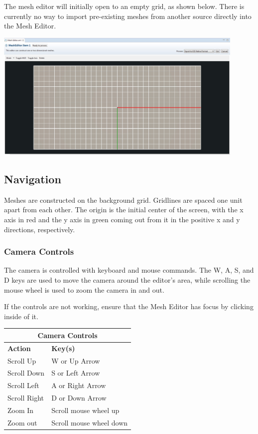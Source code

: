 \documentclass{article}
\begin{document}
The mesh editor will initially open to an empty grid, as shown below. There is
currently no way to import pre-existing meshes from another source directly
into the Mesh Editor.

\begin{center}
\includegraphics[width=12cm]{images/EmptyMeshEditor.jpg}
\end{center}

\subsection{Navigation}

Meshes are constructed on the background grid. Gridlines are spaced one unit
apart from each other. The origin is the initial center of the screen, with the
x axis in red and the y axis in green coming out from it in the positive x and y
directions, respectively. 

\subsubsection{Camera Controls}

The camera is controlled with keyboard and mouse commands. The W, A, S, and D
keys are used to move the camera around the editor's area, while scrolling the
mouse wheel is used to zoom the camera in and out. 

If the controls are not working, ensure that the Mesh Editor has focus by
clicking inside of it.

\begin{center}
    \begin{tabular}{| l | l |}
    \hline
    \multicolumn{2}{|c|}{\textbf{Camera Controls}} \\
  	\hline
    \textbf{Action} & \textbf{Key(s)} \\ \hline
    Scroll Up & W or Up Arrow\\ \hline
    Scroll Down & S or Left Arrow\\ \hline
    Scroll Left & A or Right Arrow\\ \hline
    Scroll Right & D or Down Arrow\\ \hline
    Zoom In & Scroll mouse wheel up \\ \hline
    Zoom out & Scroll mouse wheel down \\
    \hline
    \end{tabular}
\end{center}
\end{document}
